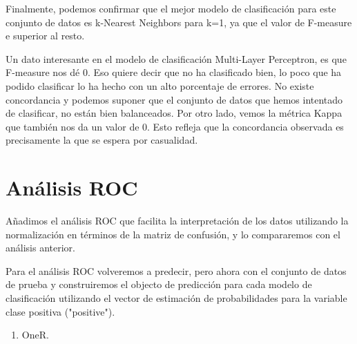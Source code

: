 \documentclass[]{article}
\newenvironment{Shaded}{\begin{snugshade}}{\end{snugshade}}
\newcommand{\DataTypeTok}[1]{\textcolor[rgb]{0.13,0.29,0.53}{#1}}
\newcommand{\KeywordTok}[1]{\textcolor[rgb]{0.13,0.29,0.53}{\textbf{#1}}}
\newcommand{\NormalTok}[1]{#1}
\newcommand{\OperatorTok}[1]{\textcolor[rgb]{0.81,0.36,0.00}{\textbf{#1}}}
\newcommand{\StringTok}[1]{\textcolor[rgb]{0.31,0.60,0.02}{#1}}
\providecommand{\tightlist}{%
  \setlength{\itemsep}{0pt}\setlength{\parskip}{0pt}}
\begin{document}
Finalmente, podemos confirmar que el mejor modelo de clasificación para este conjunto de datos es k-Nearest Neighbors para k=1, ya que el valor de F-measure e superior al resto.

Un dato interesante en el modelo de clasificación Multi-Layer Perceptron, es que F-measure nos dé 0. Eso quiere decir que no ha clasificado bien, lo poco que ha podido clasificar lo ha hecho con un alto porcentaje de errores. No existe concordancia y podemos suponer que el conjunto de datos que hemos intentado de clasificar, no están bien balanceados. Por otro lado, vemos la métrica Kappa que también nos da un valor de 0. Esto refleja que la concordancia observada es precisamente la que se espera por casualidad.

\hypertarget{anuxe1lisis-roc}{%
\section{Análisis ROC}\label{anuxe1lisis-roc}}

Añadimos el análisis ROC que facilita la interpretación de los datos utilizando la normalización en términos de la matriz de confusión, y lo compararemos con el análisis anterior. 

Para el análisis ROC volveremos a predecir, pero ahora con el conjunto de datos de prueba y construiremos el objecto de predicción para cada modelo de clasificación utilizando el vector de estimación de probabilidades para la variable clase positiva ("positive").

\newpage

\begin{enumerate}
\def\labelenumi{\arabic{enumi}.}
\tightlist
\item
  OneR.
\end{enumerate}

\begin{Shaded}
\end{Shaded}
\end{document}
